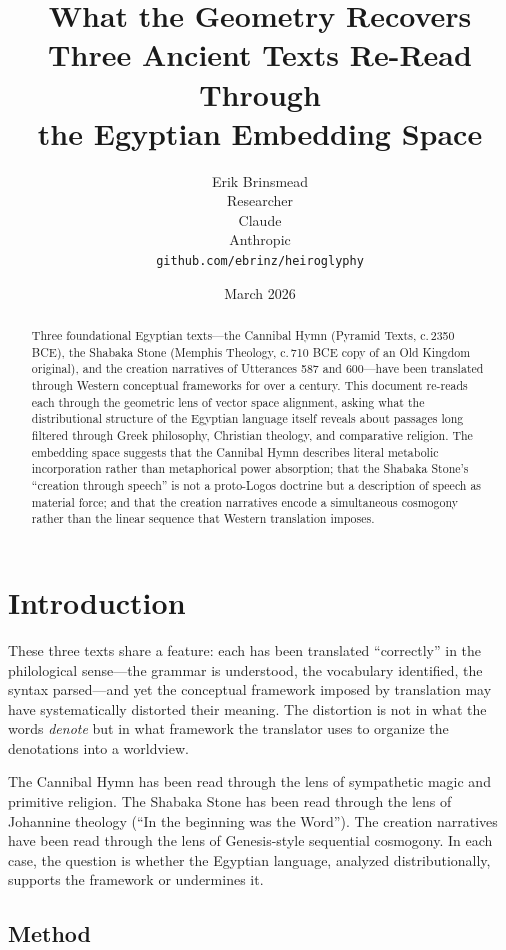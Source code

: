 \documentclass[11pt, a4paper]{article}
\title{
    \textbf{What the Geometry Recovers}\\[6pt]
    {\large Three Ancient Texts Re-Read Through\\the Egyptian Embedding Space}
}
\author{
    Erik Brinsmead \\
    Researcher \\[6pt]
    Claude \\
    Anthropic \\[12pt]
    \texttt{github.com/ebrinz/heiroglyphy}
}
\date{March 2026}
\begin{document}
\maketitle

\begin{abstract}
Three foundational Egyptian texts---the Cannibal Hymn (Pyramid Texts, c.\,2350 BCE), the Shabaka Stone (Memphis Theology, c.\,710 BCE copy of an Old Kingdom original), and the creation narratives of Utterances 587 and 600---have been translated through Western conceptual frameworks for over a century. This document re-reads each through the geometric lens of vector space alignment, asking what the distributional structure of the Egyptian language itself reveals about passages long filtered through Greek philosophy, Christian theology, and comparative religion. The embedding space suggests that the Cannibal Hymn describes literal metabolic incorporation rather than metaphorical power absorption; that the Shabaka Stone's ``creation through speech'' is not a proto-Logos doctrine but a description of speech as material force; and that the creation narratives encode a simultaneous cosmogony rather than the linear sequence that Western translation imposes.
\end{abstract}

\tableofcontents

\section{Introduction}

These three texts share a feature: each has been translated ``correctly'' in the philological sense---the grammar is understood, the vocabulary identified, the syntax parsed---and yet the conceptual framework imposed by translation may have systematically distorted their meaning. The distortion is not in what the words \textit{denote} but in what framework the translator uses to organize the denotations into a worldview.

The Cannibal Hymn has been read through the lens of sympathetic magic and primitive religion. The Shabaka Stone has been read through the lens of Johannine theology (``In the beginning was the Word''). The creation narratives have been read through the lens of Genesis-style sequential cosmogony. In each case, the question is whether the Egyptian language, analyzed distributionally, supports the framework or undermines it.

\subsection{Method}
\end{document}
